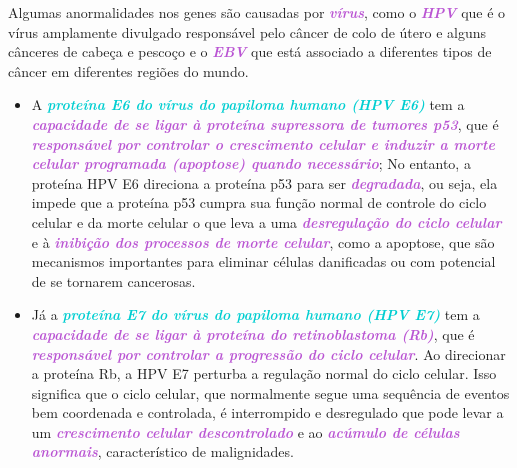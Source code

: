 \documentclass[11pt,a4paper]{article}
\begin{document}
    Algumas anormalidades nos genes são causadas por \textcolor{MediumOrchid}{\textbf{\textit{vírus}}}, como o \textcolor{MediumOrchid}{\textbf{\textit{HPV}}} que é o vírus amplamente divulgado responsável pelo câncer de colo de útero e alguns cânceres de cabeça e pescoço e o \textcolor{MediumOrchid}{\textbf{\textit{EBV}}} que está associado a diferentes tipos de câncer em diferentes regiões do mundo. 
    
    \begin{itemize}[label=\textcolor{CarnationPink}{$\blacktriangleright$}]
        \item A \textcolor{DarkTurquoise}{\textbf{\textit{proteína E6 do vírus do papiloma humano (HPV E6)}}} tem a \textcolor{MediumOrchid}{\textbf{\textit{capacidade de se ligar à proteína supressora de tumores p53}}}, que é \textcolor{MediumOrchid}{\textbf{\textit{responsável por controlar o crescimento celular e induzir a morte celular programada (apoptose) quando necessário}}}; No entanto, a proteína HPV E6 direciona a proteína p53 para ser \textcolor{MediumOrchid}{\textbf{\textit{degradada}}}, ou seja, ela impede que a proteína p53 cumpra sua função normal de controle do ciclo celular e da morte celular o que leva a uma \textcolor{MediumOrchid}{\textbf{\textit{desregulação do ciclo celular}}} e à \textcolor{MediumOrchid}{\textbf{\textit{inibição dos processos de morte celular}}}, como a apoptose, que são mecanismos importantes para eliminar células danificadas ou com potencial de se tornarem cancerosas.
        \item Já a \textcolor{DarkTurquoise}{\textbf{\textit{proteína E7 do vírus do papiloma humano (HPV E7)}}} tem a \textcolor{MediumOrchid}{\textbf{\textit{capacidade de se ligar à proteína do retinoblastoma (Rb)}}}, que é \textcolor{MediumOrchid}{\textbf{\textit{responsável por controlar a progressão do ciclo celular}}}. Ao direcionar a proteína Rb, a HPV E7 perturba a regulação normal do ciclo celular. Isso significa que o ciclo celular, que normalmente segue uma sequência de eventos bem coordenada e controlada, é interrompido e desregulado que pode levar a um \textcolor{MediumOrchid}{\textbf{\textit{crescimento celular descontrolado}}} e ao \textcolor{MediumOrchid}{\textbf{\textit{acúmulo de células anormais}}}, característico de malignidades.

\end{itemize}
\end{document}
